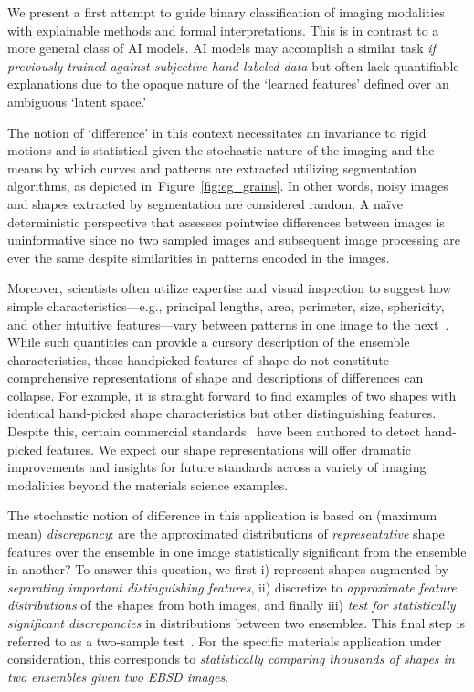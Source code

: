 \documentclass[pdflatex,iicol]{sn-jnl}%
\theoremstyle{thmstyleone}%
\theoremstyle{thmstyletwo}%
\theoremstyle{thmstylethree}%
\begin{document}
\noindent We present a first attempt to guide binary classification of imaging modalities with explainable methods and formal interpretations. This is in contrast to a more general class of AI models. AI models may accomplish a similar task \emph{if previously trained against subjective hand-labeled data} but often lack quantifiable explanations due to the opaque nature of the `learned features' defined over an ambiguous `latent space.' 

The notion of `difference' in this context necessitates an invariance to rigid motions and is statistical given the stochastic nature of the imaging and the means by which curves and patterns are extracted utilizing segmentation algorithms, as depicted in~Figure~\ref{fig:eg_grains}. In other words, noisy images and shapes extracted by segmentation are considered random. A na\"ive deterministic perspective that assesses pointwise differences between images is uninformative since no two sampled images and subsequent image processing are ever the same despite similarities in patterns encoded in the images.

Moreover, scientists often utilize expertise and visual inspection to suggest how simple characteristics---e.g., principal lengths, area, perimeter, size, sphericity, and other intuitive features---vary between patterns in one image to the next~\cite{stoudt2020location, ASTM_E562, ASTM_E930, ASTM_E112}. While such quantities can provide a cursory description of the ensemble characteristics, these handpicked features of shape do not constitute comprehensive representations of shape and descriptions of differences can collapse. For example, it is straight forward to find examples of two shapes with identical hand-picked shape characteristics but other distinguishing features. Despite this, certain commercial standards~\cite{kazakov2019astm, ASTM_E562, ASTM_E930, ASTM_E112} have been authored to detect hand-picked features. We expect our shape representations will offer dramatic improvements and insights for future standards across a variety of imaging modalities beyond the materials science examples.

The stochastic notion of difference in this application is based on (maximum mean) \emph{discrepancy}: are the approximated distributions of \emph{representative} shape features over the ensemble in one image statistically significant from the ensemble in another? To answer this question, we first i) represent shapes augmented by \emph{separating important distinguishing features}, ii) discretize to \emph{approximate feature distributions} of the shapes from both images, and finally iii) \emph{test for statistically significant discrepancies} in distributions between two ensembles. This final step is referred to as a two-sample test~\cite{gretton2012kernel}. For the specific materials application under consideration, this corresponds to \emph{statistically comparing thousands of shapes in two ensembles given two EBSD images}. %
\end{document}
